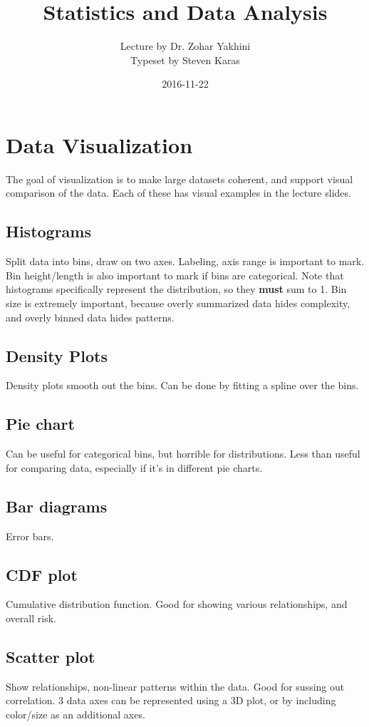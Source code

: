 \documentclass[a4paper]{article}
\title{Statistics and Data Analysis}
\date{2016-11-22}
\author{Lecture by Dr. Zohar Yakhini\\Typeset by Steven Karas}
\begin{document}
\maketitle

\section{Data Visualization}
The goal of visualization is to make large datasets coherent, and support visual comparison of the data. Each of these has visual examples in the lecture slides.

\subsection{Histograms}
Split data into bins, draw on two axes. Labeling, axis range is important to mark. Bin height/length is also important to mark if bins are categorical. Note that histograms specifically represent the distribution, so they {\bf must} sum to 1. Bin size is extremely important, because overly summarized data hides complexity, and overly binned data hides patterns.

\subsection{Density Plots}
Density plots smooth out the bins. Can be done by fitting a spline over the bins.

\subsection{Pie chart}
Can be useful for categorical bins, but horrible for distributions. Less than useful for comparing data, especially if it's in different pie charts.

\subsection{Bar diagrams}
Error bars.

\subsection{CDF plot}
Cumulative distribution function. Good for showing various relationships, and overall risk.

\subsection{Scatter plot}
Show relationships, non-linear patterns within the data. Good for sussing out correlation. 3 data axes can be represented using a 3D plot, or by including color/size as an additional axes.
\end{document}
